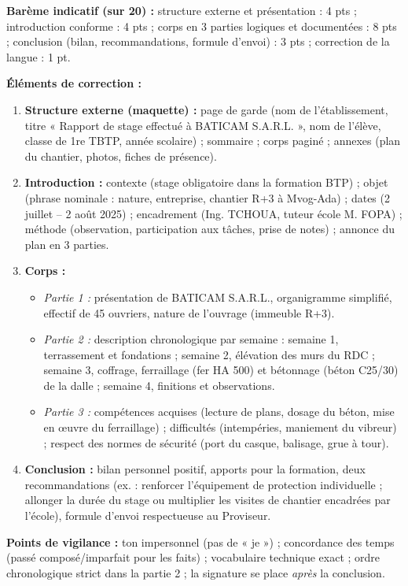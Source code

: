 \documentclass[11pt]{article}
\begin{document}
\begin{corrige}
\textbf{Barème indicatif (sur 20) :} structure externe et présentation : 4 pts ; introduction conforme : 4 pts ; corps en 3 parties logiques et documentées : 8 pts ; conclusion (bilan, recommandations, formule d'envoi) : 3 pts ; correction de la langue : 1 pt.

\textbf{Éléments de correction :}
\begin{enumerate}
    \item \textbf{Structure externe (maquette) :} page de garde (nom de l'établissement, titre « Rapport de stage effectué à BATICAM S.A.R.L. », nom de l'élève, classe de 1re TBTP, année scolaire) ; sommaire ; corps paginé ; annexes (plan du chantier, photos, fiches de présence).
    \item \textbf{Introduction :} contexte (stage obligatoire dans la formation BTP) ; objet (phrase nominale : nature, entreprise, chantier R+3 à Mvog-Ada) ; dates (2 juillet -- 2 août 2025) ; encadrement (Ing. TCHOUA, tuteur école M. FOPA) ; méthode (observation, participation aux tâches, prise de notes) ; annonce du plan en 3 parties.
    \item \textbf{Corps :}
    \begin{itemize}
        \item \emph{Partie 1 :} présentation de BATICAM S.A.R.L., organigramme simplifié, effectif de 45 ouvriers, nature de l'ouvrage (immeuble R+3).
        \item \emph{Partie 2 :} description chronologique par semaine : semaine 1, terrassement et fondations ; semaine 2, élévation des murs du RDC ; semaine 3, coffrage, ferraillage (fer HA 500) et bétonnage (béton C25/30) de la dalle ; semaine 4, finitions et observations.
        \item \emph{Partie 3 :} compétences acquises (lecture de plans, dosage du béton, mise en œuvre du ferraillage) ; difficultés (intempéries, maniement du vibreur) ; respect des normes de sécurité (port du casque, balisage, grue à tour).
    \end{itemize}
    \item \textbf{Conclusion :} bilan personnel positif, apports pour la formation, deux recommandations (ex. : renforcer l'équipement de protection individuelle ; allonger la durée du stage ou multiplier les visites de chantier encadrées par l'école), formule d'envoi respectueuse au Proviseur.
\end{enumerate}
\textbf{Points de vigilance :} ton impersonnel (pas de « je ») ; concordance des temps (passé composé/imparfait pour les faits) ; vocabulaire technique exact ; ordre chronologique strict dans la partie 2 ; la signature se place \emph{après} la conclusion.
\end{corrige}
\end{document}
